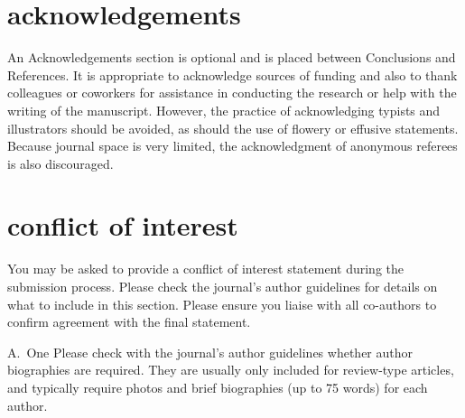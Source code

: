 \documentclass[num-refs]{wiley-article}
\begin{document}
\section*{acknowledgements}
An Acknowledgements section is optional and is placed between Conclusions and References. 
It is appropriate to acknowledge sources of funding and also to thank colleagues or coworkers for assistance in conducting the research or help with the writing of the manuscript. 
However, the practice of acknowledging typists and illustrators should be avoided, as should the use of flowery or effusive statements. 
Because journal space is very limited, the acknowledgment of anonymous referees is also discouraged.

\section*{conflict of interest}
You may be asked to provide a conflict of interest statement during the submission process. 
Please check the journal's author guidelines for details on what to include in this section. 
Please ensure you liaise with all co-authors to confirm agreement with the final statement.

\printendnotes



\begin{biography}{A.~One}
Please check with the journal's author guidelines whether author biographies are required. 
They are usually only included for review-type articles, and typically require photos and brief biographies (up to 75 words) for each author.
\bigskip
\bigskip
\end{biography}

\end{document}
